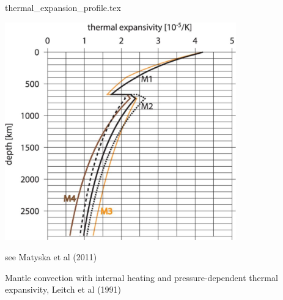 \begin{flushright} {\tiny {\color{gray} thermal\_expansion\_profile.tex}} \end{flushright}

\includegraphics[width=10cm]{images/thermal_expansion/stca06.jpg}

see Matyska et al (2011) \cite{mayw11}

Mantle convection with internal heating and pressure-dependent thermal expansivity, Leitch et al (1991) \cite{leys91}
